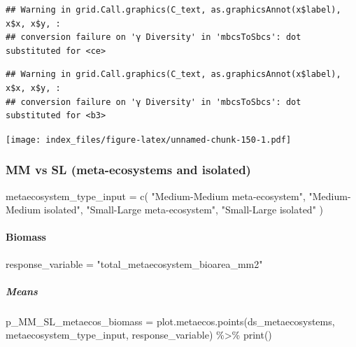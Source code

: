 \documentclass[
]{article}
\newenvironment{Shaded}{\begin{snugshade}}{\end{snugshade}}
\newcommand{\FunctionTok}[1]{\textcolor[rgb]{0.00,0.00,0.00}{#1}}
\newcommand{\NormalTok}[1]{#1}
\newcommand{\OtherTok}[1]{\textcolor[rgb]{0.56,0.35,0.01}{#1}}
\newcommand{\SpecialCharTok}[1]{\textcolor[rgb]{0.00,0.00,0.00}{#1}}
\newcommand{\StringTok}[1]{\textcolor[rgb]{0.31,0.60,0.02}{#1}}
\begin{document}
\begin{verbatim}
## Warning in grid.Call.graphics(C_text, as.graphicsAnnot(x$label), x$x, x$y, :
## conversion failure on 'γ Diversity' in 'mbcsToSbcs': dot substituted for <ce>
\end{verbatim}

\begin{verbatim}
## Warning in grid.Call.graphics(C_text, as.graphicsAnnot(x$label), x$x, x$y, :
## conversion failure on 'γ Diversity' in 'mbcsToSbcs': dot substituted for <b3>
\end{verbatim}

\texttt{[image: index\_files/figure-latex/unnamed-chunk-150-1.pdf]}

\hypertarget{mm-vs-sl-meta-ecosystems-and-isolated}{%
\subsubsection{MM vs SL (meta-ecosystems and
isolated)}\label{mm-vs-sl-meta-ecosystems-and-isolated}}

\begin{Shaded}
\begin{Highlighting}[]
\NormalTok{metaecosystem\_type\_input }\OtherTok{=} \FunctionTok{c}\NormalTok{(}
  \StringTok{"Medium{-}Medium meta{-}ecosystem"}\NormalTok{,}
  \StringTok{"Medium{-}Medium isolated"}\NormalTok{,}
  \StringTok{"Small{-}Large meta{-}ecosystem"}\NormalTok{,}
  \StringTok{"Small{-}Large isolated"}
\NormalTok{)}
\end{Highlighting}
\end{Shaded}

\hypertarget{biomass-1}{%
\paragraph{Biomass}\label{biomass-1}}

\begin{Shaded}
\begin{Highlighting}[]
\NormalTok{response\_variable }\OtherTok{=} \StringTok{"total\_metaecosystem\_bioarea\_mm2"}
\end{Highlighting}
\end{Shaded}

\hypertarget{means-4}{%
\subparagraph{Means}\label{means-4}}

\begin{Shaded}
\begin{Highlighting}[]
\NormalTok{p\_MM\_SL\_metaecos\_biomass }\OtherTok{=} \FunctionTok{plot.metaecos.points}\NormalTok{(ds\_metaecosystems, }
\NormalTok{                                                metaecosystem\_type\_input,}
\NormalTok{                                                response\_variable) }\SpecialCharTok{\%\textgreater{}\%}
  \FunctionTok{print}\NormalTok{()}
\end{Highlighting}
\end{Shaded}
\end{document}
